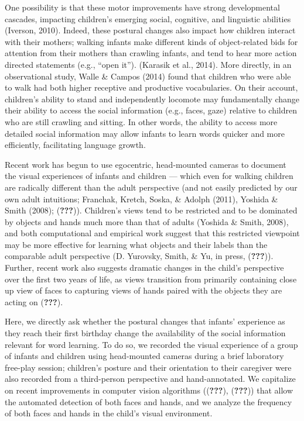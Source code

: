 \documentclass[10pt, letterpaper]{article}
\begin{document}
One possibility is that these motor improvements have strong
developmental cascades, impacting children's emerging social, cognitive,
and linguistic abilities (Iverson, 2010). Indeed, these postural changes
also impact how children interact with their mothers; walking infants
make different kinds of object-related bids for attention from their
mothers than crawling infants, and tend to hear more action directed
statements (e.g., ``open it''). (Karasik et al., 2014). More directly,
in an observational study, Walle \& Campos (2014) found that children
who were able to walk had both higher receptive and productive
vocabularies. On their account, children's ability to stand and
independently locomote may fundamentally change their ability to access
the social information (e.g., faces, gaze) relative to children who are
still crawling and sitting. In other words, the ability to access more
detailed social information may allow infants to learn words quicker and
more efficiently, facilitating language growth.

Recent work has begun to use egocentric, head-mounted cameras to
document the visual experiences of infants and children --- which even
for walking children are radically different than the adult perspective
(and not easily predicted by our own adult intuitions; Franchak, Kretch,
Soska, \& Adolph (2011), Yoshida \& Smith (2008); ({\textbf{???}})).
Children's views tend to be restricted and to be dominated by objects
and hands much more than that of adults (Yoshida \& Smith, 2008), and
both computational and empirical work suggest that this restricted
viewpoint may be more effective for learning what objects and their
labels than the comparable adult perspective (D. Yurovsky, Smith, \& Yu,
in press, ({\textbf{???}})). Further, recent work also suggests dramatic
changes in the child's perspective over the first two years of life, as
views transition from primarily containing close up view of faces to
capturing views of hands paired with the objects they are acting on
({\textbf{???}}).

Here, we directly ask whether the postural changes that infants'
experience as they reach their first birthday change the availability of
the social information relevant for word learning. To do so, we recorded
the visual experience of a group of infants and children using
head-mounted cameras during a brief laboratory free-play session;
children's posture and their orientation to their caregiver were also
recorded from a third-person perspective and hand-annotated. We
capitalize on recent improvements in computer vision algorithms
(({\textbf{???}}), ({\textbf{???}})) that allow the automated detection
of both faces and hands, and we analyze the frequency of both faces and
hands in the child's visual environment.
\end{document}
